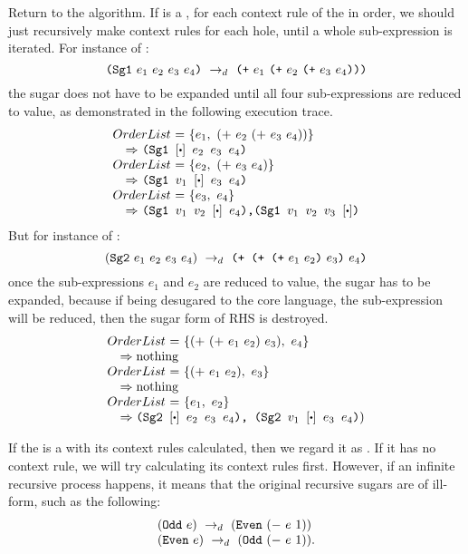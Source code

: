 Return to the algorithm. If  is a , for each context rule of the  in order, we should just recursively make context rules for each hole, until a whole sub-expression is iterated. For instance of :
\[
\mbox{\tt (Sg1}~e_1~e_2~e_3~e_4\mbox{\tt )} ~\rightarrow_d~ \mbox{\tt (+}~e_1~\mbox{\tt (+}~e_2~\mbox{\tt (+}~e_3~e_4\mbox{\tt )))}
\]
the sugar does not have to be expanded until all four sub-expressions are reduced to value, as demonstrated in the following execution trace.
\[
\begin{array}{l}
\mbox{$OrderList$ = $\{e_1,~(+~e_2~(+~e_3~e_4))\}$} \\
\quad \mbox{$\Rightarrow$ \Code{(Sg1 $[\bigcdot]~e_2~e_3~e_4$)}}\\
\mbox{$OrderList$ = $\{e_2,~(+~e_3~e_4)\}$}\\
\quad \mbox{$\Rightarrow$ \Code{(Sg1 $v_1~[\bigcdot]~e_3~e_4$)}}\\
\mbox{$OrderList$ = $\{e_3,~e_4\}$} \\
\quad \mbox{$\Rightarrow$ \Code{(Sg1 $v_1~v_2~[\bigcdot]~e_4$),(Sg1 $v_1~v_2~v_3~[\bigcdot]$)}}
\end{array}
\]
But for instance of :
\[
(\mbox{\tt Sg2}~e_1~e_2~e_3~e_4) ~\rightarrow_d~ \mbox{\tt (+~(+~(+}~e_1~e_2\mbox{\tt )}~e_3\mbox{\tt )}~e_4\mbox{\tt )}
\]
once the sub-expressions $e_1$ and $e_2$ are reduced to value, the sugar has to be expanded, because if being desugared to the core language, the sub-expression  will be reduced, then the sugar form of RHS is destroyed.
\[
\begin{array}{l}
\mbox{$OrderList$ = $\{(+~(+~e_1~e_2)~e_3),~e_4\}$}\\
\quad \Rightarrow \mbox{nothing}\\
\mbox{$OrderList$ = $\{(+~e_1~e_2),~e_3\}$}\\
\quad \Rightarrow \mbox{nothing}\\
\mbox{$OrderList$ = $\{e_1,~e_2\}$}\\
\quad \Rightarrow \mbox{\Code{(Sg2 $[\bigcdot]~e_2~e_3~e_4$), (Sg2 $v_1~[\bigcdot]~e_3~e_4$)})}
\end{array}
\]

If the  is a  with its context rules calculated, then we regard it as . If it has no context rule, we will try calculating its context rules first. However, if an infinite recursive process happens, it means that the original recursive sugars are of ill-form, such as the following:
\[
\begin{array}{l}
(\mbox{\tt Odd}~e) ~\rightarrow_d~ (\mbox{\tt Even}~(-~e~1))\\
(\mbox{\tt Even}~e) ~\rightarrow_d~ (\mbox{\tt Odd}~(-~e~1)).
\end{array}
\]


